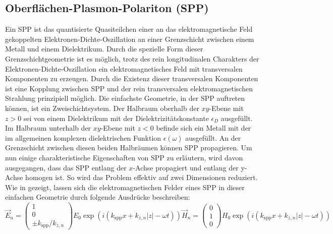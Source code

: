 \documentclass[titlepage]{article}
\begin{document}
	\subsection{Oberflächen-Plasmon-Polariton (SPP)}		
	Ein SPP ist das quantisierte Quasiteilchen einer an das elektromagnetische Feld gekoppelten Elektronen-Dichte-Oszillation an einer Grenzschicht zwischen einem Metall und einem Dielektrikum. Durch die spezielle Form dieser Grenzschichtgeometrie ist es möglich, trotz des rein longitudinalen Charakters der Elektronen-Dichte-Oszillation ein elektromagnetisches Feld mit transversalen Komponenten zu erzeugen. Durch die Existenz dieser transversalen Komponenten ist eine Kopplung zwischen SPP und der rein transversalen elektromagnetischen Strahlung prinzipiell möglich. Die einfachste Geometrie, in der SPP auftreten können, ist ein Zweischichtsystem. Der Halbraum oberhalb der $xy$-Ebene mit $z>0$ sei von einem Dielektrikum mit der Dielektrizitätskonstante $\epsilon_D$ ausgefüllt. Im Halbraum unterhalb der $xy$-Ebene mit $z<0$ befinde sich ein Metall mit der im allgemeinen komplexen dielektrischen Funktion $\epsilon(\omega)$ ausgefüllt. An der Grenzschicht zwischen diesen beiden Halbräumen können SPP propagieren. Um nun einige charakteristische Eigenschaften von SPP zu erläutern, wird davon ausgegangen, dass das SPP entlang der $x$-Achse propagiert und entlang der y-Achse homogen ist. So wird das Problem effektiv auf zwei Dimensionen reduziert. Wie in \cite{Maier.2007} gezeigt, lassen sich die elektromagnetischen Felder eines SPP in dieser einfachen Geometrie durch folgende Ausdrücke beschreiben:
	\begin{subequations}
		\label{eq:fields_spp}
		\begin{equation}
			\label{eq:electric_field_spp}
			\vec{E}_n = \begin{pmatrix} 1 \\ 0 \\ \pm k_{\mathrm{spp}}/k_{z,n} \end{pmatrix} E_0 \exp\left(i(k_{\mathrm{spp}}x + k_{z, n}|z|-\omega t)\right)	
		\end{equation}
		\begin{equation}
			\label{eq:magnetic_field_spp}
			\vec{H}_n = \begin{pmatrix} 0 \\ 1 \\ 0 \end{pmatrix} H_0 \exp\left(i(k_{\mathrm{spp}}x + k_{z, n}|z|-\omega t)\right)
		\end{equation}
	\end{subequations}
	
\end{document}
